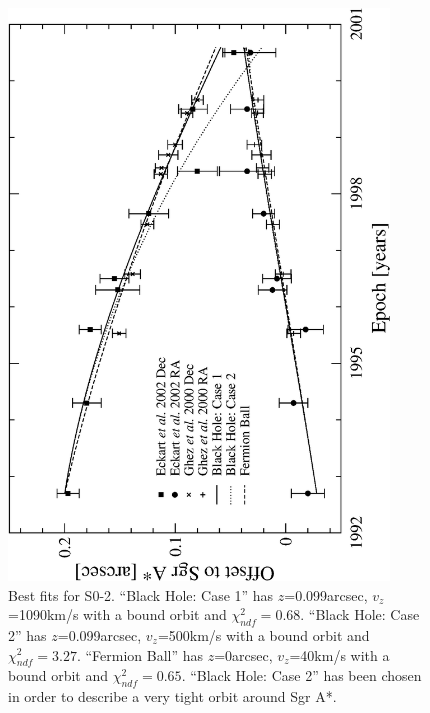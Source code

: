 \begin{figure}[!p]
	\begin{center}
	\includegraphics[angle=-90,width=0.9\textwidth]{eps/bestfits-so2.eps}
	\caption{Best fits for S0-2.
	``Black Hole: Case 1'' has $z$=0.099arcsec, $v_z$=1090km/s with a bound orbit and $\chi^2_{ndf}=0.68$.
	``Black Hole: Case 2'' has $z$=0.099arcsec, $v_z$=500km/s with a bound orbit and $\chi^2_{ndf}=3.27$.
	``Fermion Ball'' has $z$=0arcsec, $v_z$=40km/s with a bound orbit and $\chi^2_{ndf}=0.65$.
	``Black Hole: Case 2'' has been chosen in order to describe a very tight orbit around Sgr A*.}
	\label{fig_so2bestfits}
	\end{center}
\end{figure}

